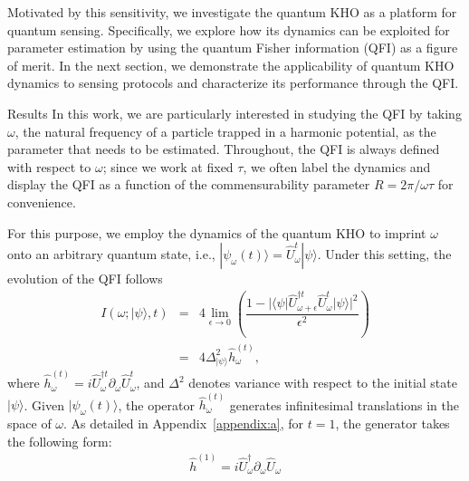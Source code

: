 \documentclass[amsmath,nobibnotes,aps,amssymb,pra, prl,aps,showpacs,superscriptaddress,twocolumn, longbibliography, reprint]{revtex4-2}
\begin{document}
Motivated by this sensitivity, we investigate the quantum KHO as a platform for quantum sensing. Specifically, we explore how its dynamics can be exploited for parameter estimation by using the quantum Fisher information (QFI) as a figure of merit. In the next section, we demonstrate the applicability of quantum KHO dynamics to sensing protocols and characterize its performance through the QFI.



\begin{section}{Results}
\label{section-3}
In this work, we are particularly interested in studying the QFI by taking $\omega$, the natural frequency of a particle trapped in a harmonic potential, as the parameter that needs to be estimated.  Throughout, the QFI is always defined with respect to $\omega$; since we work at fixed $\tau$, we often label the dynamics and display the QFI as a function of the commensurability parameter $R=2\pi/\omega\tau$ for convenience. 

For this purpose, we employ the dynamics of the quantum KHO to imprint $\omega$ onto an arbitrary quantum state, i.e., $|\psi_\omega (t)\rangle=\hat{U}^{t}_{\omega}|\psi\rangle$. Under this setting, the evolution of the QFI follows 
\begin{eqnarray}\label{quench}
I(\omega ;|\psi\rangle, t)&=& 4\lim_{\epsilon\rightarrow 0}\left( \dfrac{1-|\langle\psi|\hat{U}_{\omega+\epsilon}^{\dagger t}\hat{U}^{t}_{\omega}|\psi\rangle|^2}{\epsilon^2} \right)\nonumber\\
&=& 4\Delta^2_{|\psi\rangle} \hat{h}^{(t)}_{\omega},
\end{eqnarray}
where $\hat{h}^{(t)}_{\omega} =i \hat{U}^{\dagger t}_{\omega}\partial_{\omega}\hat{U}^{t}_{\omega}$, and $\Delta^2$ denotes variance with respect to the initial state $|\psi\rangle$. Given $|\psi_{\omega}(t)\rangle$, the operator $\hat{h}^{(t)}_{\omega}$ generates infinitesimal translations in the space of $\omega$. As detailed in Appendix~\ref{appendix:a}, for $t=1$, the generator takes the following form:
\begin{eqnarray}\label{generator_exp}
\hat{h}^{\left(1\right)}=i\hat{U}_{\omega}^\dagger \partial_{\omega}\hat{U}_{\omega}

\end{eqnarray}
\end{section}
\end{document}
